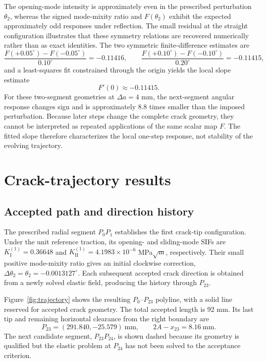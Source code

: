 \documentclass[11pt]{article}
\newcommand{\LastXMM}{291.840}
\newcommand{\LastYMM}{-25.579}
\newcommand{\LastLigamentMM}{8.16}
\begin{document}
The opening-mode intensity is approximately even in the
prescribed perturbation $\theta_2$, whereas the signed mode-mixity
ratio and $F(\theta_2)$ exhibit the expected approximately odd
responses under reflection. The small residual at the straight
configuration illustrates that these symmetry relations are
recovered numerically rather than as exact identities.
The two symmetric finite-difference estimates are
\[
 \frac{F(+0.05^\circ)-F(-0.05^\circ)}{0.10^\circ}
 =-0.11416,
 \qquad
 \frac{F(+0.10^\circ)-F(-0.10^\circ)}{0.20^\circ}
 =-0.11415,
\]
and a least-squares fit constrained through the origin yields the local
slope estimate
\begin{equation}
 F'(0)\approx-0.11415.
 \label{eq:symmetric-multiplier}
\end{equation}
For these two-segment geometries at $\Delta a=4$ mm,
the next-segment angular response changes sign and is
approximately 8.8 times smaller than the imposed perturbation.
Because later steps change the complete crack geometry,
they cannot be interpreted as repeated applications of
the same scalar map $F$. The fitted slope therefore
characterizes the local one-step response, not stability
of the evolving trajectory.

\section{Crack-trajectory results}
\label{sec:results}
\subsection{Accepted path and direction history}
The prescribed radial segment $P_0P_1$ establishes the first
crack-tip configuration. Under the unit reference traction, its
opening- and sliding-mode SIFs are
$K_{\mathrm{I}}^{(1)}=0.36648$ and
$K_{\mathrm{II}}^{(1)}=4.1983\times10^{-6}$ MPa$\sqrt{\mathrm m}$,
respectively. Their small positive mode-mixity ratio gives an
initial clockwise correction,
$\Delta\theta_2=\theta_2=-0.0013127^\circ$.
Each subsequent accepted crack direction is obtained from a newly
solved elastic field, producing the history through $P_{23}$.

Figure~\ref{fig:trajectory} shows the resulting $P_0$--$P_{23}$
polyline, with a solid line reserved for accepted crack geometry.
The total accepted length is 92 mm. Its last tip and remaining
horizontal clearance from the right boundary are
\begin{equation}
 P_{23}=(\LastXMM,\LastYMM)\ \mathrm{mm},\qquad
 2A-x_{23}=\LastLigamentMM\ \mathrm{mm}.
\end{equation}
The next candidate segment, $P_{23}P_{24}$, is shown dashed
because its geometry is qualified but the elastic problem at
$P_{24}$ has not been solved to the acceptance criterion.
\end{document}
